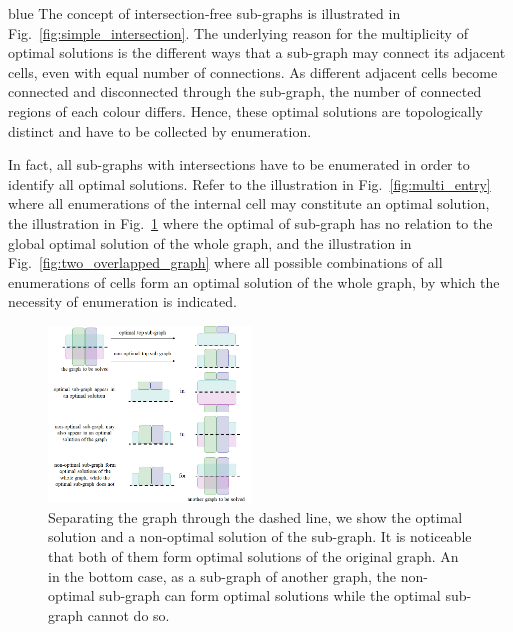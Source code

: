 \documentclass[journal]{IEEEtran}
\begin{document}
\begin{color}{blue}
The concept of intersection-free sub-graphs is illustrated in Fig.~\ref{fig:simple_intersection}. 
The underlying reason for the multiplicity of optimal solutions is the different ways that a sub-graph may connect its adjacent cells, even with equal number of connections. 
As different adjacent cells become connected and disconnected through the sub-graph, the number of connected regions of each colour differs. 
Hence, these optimal solutions are topologically distinct and have to be collected by enumeration. 

In fact, all sub-graphs with intersections have to be enumerated in order to identify all optimal solutions. 
Refer to the illustration in Fig.~\ref{fig:multi_entry} where all enumerations of the internal cell may constitute an optimal solution, 
the illustration in Fig.~\ref{fig:local_combined} where the optimal of sub-graph has no relation to the global optimal solution of the whole graph, 
and the illustration in Fig.~\ref{fig:two_overlapped_graph} where all possible combinations of all enumerations of cells form an optimal solution of the whole graph, by which the necessity of enumeration is indicated. 

\end{color}

\begin{figure}[t]
\centering
\includegraphics[width=0.48\textwidth]{figures/local_combined}
\caption{Separating the graph through the dashed line, we show the optimal solution and a non-optimal solution of the sub-graph. It is noticeable that both of them form optimal solutions of the original graph. An in the bottom case, as a sub-graph of another graph, the non-optimal sub-graph can form optimal solutions while the optimal sub-graph cannot do so. }\label{fig:local_combined}
\end{figure}
\end{document}
